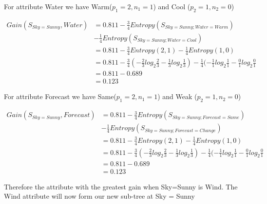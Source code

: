 \documentclass[10pt,a4paper]{article}
\begin{document}
{{{{{{{{{{For attribute Water we have Warm($p_1=2,n_1=1$) and Cool ($p_2=1,n_2=0$)

\begin{equation}
\begin{split}
Gain(S_{Sky=Sunny},Water) &= 0.811 - \frac{3}{4} Entropy(S_{Sky=Sunny;Water=Warm} )\\
                                      &-\frac{1}{4}Entropy(S_{Sky=Sunny;Water=Cool})\\
          &= 0.811 - \frac{3}{4} Entropy(2,1) - \frac{1}{4}Entropy(1,0) \\
          &= 0.811 - \frac{3}{4}( -\frac{2}{3} log_2\frac{2}{3} -\frac{1}{3} log_2\frac{1}{3} ) 
                   - \frac{1}{4}( -\frac{1}{1} log_2\frac{1}{1} -\frac{0}{1} log_2\frac{0}{1} \\
          &= 0.811 - 0.689  \\
          &= 0.123
\end{split}
\end{equation}

For attribute Forecast we have Same($p_1=2,n_1=1$) and Weak ($p_2=1,n_2=0$)

\begin{equation}
\begin{split}
Gain(S_{Sky=Sunny},Forecast) &= 0.811 - \frac{3}{4} Entropy(S_{Sky=Sunny;Forecast=Same} )\\
                                      &-\frac{1}{4}Entropy(S_{Sky=Sunny;Forecast=Change})\\
          &= 0.811 - \frac{3}{4} Entropy(2,1) - \frac{1}{4}Entropy(1,0) \\
          &= 0.811 - \frac{3}{4}( -\frac{2}{3} log_2\frac{2}{3} -\frac{1}{3} log_2\frac{1}{3} ) 
                   - \frac{1}{4}( -\frac{1}{1} log_2\frac{1}{1} -\frac{0}{1} log_2\frac{0}{1} \\
          &= 0.811 - 0.689  \\
          &= 0.123
\end{split}
\end{equation}

Therefore the attribute with the greatest gain when Sky=Sunny is Wind. The Wind attribute will now form our new sub-tree at Sky = Sunny 


}}}}}}}}}}
\end{document}
